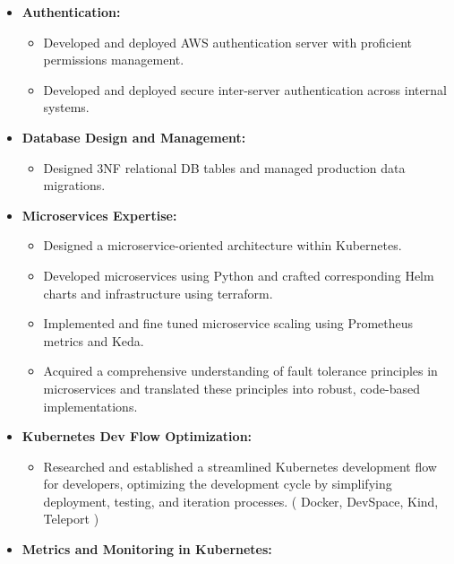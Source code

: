 \documentclass[10pt,a4paper]{altacv}
\begin{document}
\begin{itemize}
\item \textbf{Authentication:}
  \begin{itemize}
    \item Developed and deployed AWS authentication server with proficient permissions management.
    \item Developed and deployed secure inter-server authentication across internal systems.
  \end{itemize}
\item \textbf{Database Design and Management:}
  \begin{itemize}
    \item Designed 3NF relational DB tables  and managed production data migrations.
  \end{itemize}
\item \textbf{Microservices Expertise:}
  \begin{itemize}
    \item Designed a microservice-oriented architecture within Kubernetes.
    \item Developed microservices using Python and crafted corresponding Helm charts and infrastructure using terraform.
    \item Implemented and fine tuned microservice scaling using Prometheus metrics and Keda.
    \item Acquired a comprehensive understanding of fault tolerance principles in microservices and translated these principles into robust, code-based implementations.
  \end{itemize}
\item \textbf{Kubernetes Dev Flow Optimization:}
  \begin{itemize}
    \item Researched and established a streamlined Kubernetes development flow for developers, optimizing the development cycle by simplifying deployment, testing, and iteration processes. ( Docker, DevSpace, Kind, Teleport ) 
  \end{itemize}
\item \textbf{Metrics and Monitoring in Kubernetes:}

\end{itemize}
\end{document}
